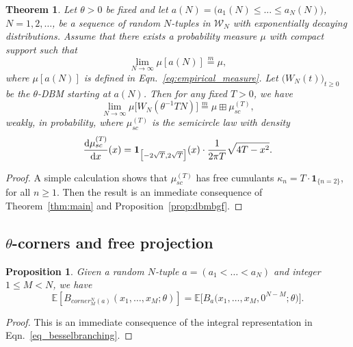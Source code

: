 \documentclass[11pt]{article}
\theoremstyle{plain}
\newtheorem{theorem}[lemma]{Theorem}
\newtheorem{proposition}[lemma]{Proposition}
\newcommand{\E}{\mathbb E}
\renewcommand{\d}{\textrm d}
\begin{document}

\begin{theorem}\label{thm:beta_dyson}
   Let $\theta>0$ be fixed and let $a(N) = \big(a_1(N)\le ...\le a_N(N)\big)$, $N=1,2,\dots$, be a sequence of random $N$-tuples in $\mathcal{W}_N$ with exponentially decaying distributions. Assume that there exists a probability measure $\mu$ with compact support such that
    \[
    \lim_{N\rightarrow\infty}\mu[a(N)]\stackrel{m}{=}\mu,
    \]
    where $\mu[a(N)]$ is defined in Eqn.~\eqref{eq:empirical_measure}.
     Let $\big(W_N(t)\big)_{t\ge 0}$ be the $\theta$-DBM starting at $a(N)$. Then for any fixed $T>0$, we have
    \[
    \lim_{N\rightarrow\infty}\mu\Big[W_N(\theta^{-1} TN)\Big]\stackrel{m}{=}\mu\boxplus\mu_{sc}^{(T)},
    \]
    weakly, in probability, where $\mu_{sc}^{(T)}$ is the semicircle law with density
    \[
    \frac{\d\mu_{sc}^{(T)}}{\d x}(x) = \mathbf{1}_{\big[ -2\sqrt{T}, 2\sqrt{T} \big]}(x)\cdot\frac{1}{2\pi T}\sqrt{4T-x^{2}}.%
    \]
\end{theorem}
\begin{proof}
    A simple calculation shows that $\mu_{sc}^{(T)}$ has free cumulants $\kappa_n=T\cdot\mathbf{1}_{\{n=2\}}$, for all $n\ge 1$. Then the result is an immediate consequence of Theorem~\ref{thm:main} and Proposition~\ref{prop:dbmbgf}.
\end{proof}


\subsection{$\theta$-corners and free projection}


\begin{proposition}\label{prop:bgfcorners}
    Given a random $N$-tuple $a=(a_1<\dots<a_N)$ and integer $1\le M<N$, we have
\[
\E\left[B_{corner_{M}^{N}(a)}(x_{1},\dots,x_{M};\theta)\right] = \E\Big[B_a\big(x_1,\dots,x_M,0^{N-M};\theta\big)\Big].
\]
\end{proposition}
\begin{proof}
    This is an immediate consequence of the integral representation in Eqn.~\eqref{eq_besselbranching}.
\end{proof}
\end{document}
